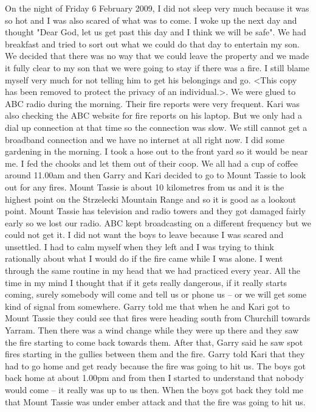 \documentclass[a4paper]{article}
\begin{document}
        On the night of Friday 6 February 2009, I did not sleep very much because it was so hot and I was also scared of what was to come. I woke up the next day and thought "Dear God, let us get past this day and I think we will be safe".
        We had breakfast and tried to sort out what we could do that day to entertain my son. We decided that there was no way that we could leave the property and we made it fully clear to my son that we were going to stay if there was a fire. I still blame myself very much for not telling him to get his belongings and go. <This copy has been removed to protect the privacy of an individual.>.
        We were glued to ABC radio during the morning. Their fire reports were very frequent. Kari was also checking the ABC website for fire reports on his laptop. But we only had a dial up connection at that time so the connection was slow. We still cannot get a broadband connection and we have no internet at all right now.
        I did some gardening in the morning. I took a hose out to the front yard so it would be near me. I fed the chooks and let them out of their coop. We all had a cup of coffee around 11.00am and then Garry and Kari decided to go to Mount Tassie to look out for any fires. Mount Tassie is about 10 kilometres from us and it is the highest point on the Strzelecki Mountain Range and so it is good as a lookout point. Mount Tassie has television and radio towers and they got damaged fairly early so we lost our radio. ABC kept broadcasting on a different frequency but we could not get it.
        I did not want the boys to leave because I was scared and unsettled. I had to calm myself when they left and I was trying to think rationally about what I would do if the fire came while I was alone. I went through the same routine in my head that we had practiced every year. All the time in my mind I thought that if it gets really dangerous, if it really starts coming, surely somebody will come and tell us or phone us – or we will get some kind of signal from somewhere.
        Garry told me that when he and Kari got to Mount Tassie they could see that fires were heading south from Churchill towards Yarram. Then there was a wind change while they were up there and they saw the fire starting to come back towards them. After that, Garry said he saw spot fires starting in the gullies between them and the fire. Garry told Kari that they had to go home and get ready because the fire was going to hit us.
        The boys got back home at about 1.00pm and from then I started to understand that nobody would come – it really was up to us then. When the boys got back they told me that Mount Tassie was under ember attack and that the fire was going to hit us.
\end{document}
